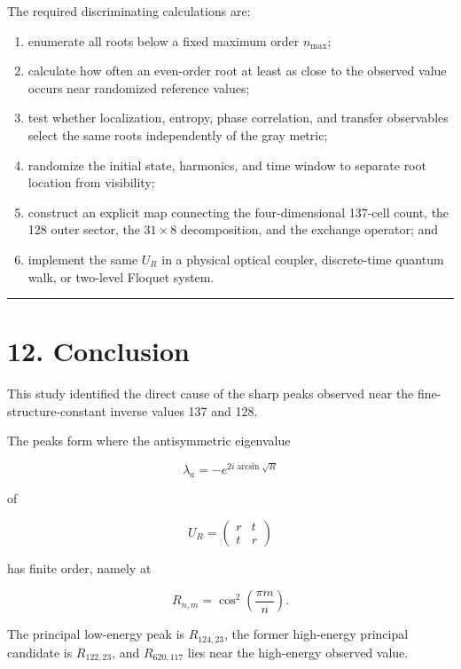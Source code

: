 \documentclass[
  10pt,
  a4paper,
]{article}
\providecommand{\tightlist}{%
  \setlength{\itemsep}{0pt}\setlength{\parskip}{0pt}}
\begin{document}
The required discriminating calculations are:

\begin{enumerate}
\def\labelenumi{\arabic{enumi}.}
\tightlist
\item
  enumerate all roots below a fixed maximum order \(n_{\max}\);
\item
  calculate how often an even-order root at least as close to the
  observed value occurs near randomized reference values;
\item
  test whether localization, entropy, phase correlation, and transfer
  observables select the same roots independently of the gray metric;
\item
  randomize the initial state, harmonics, and time window to separate
  root location from visibility;
\item
  construct an explicit map connecting the four-dimensional 137-cell
  count, the 128 outer sector, the \(31\times8\) decomposition, and the
  exchange operator; and
\item
  implement the same \(U_R\) in a physical optical coupler,
  discrete-time quantum walk, or two-level Floquet system.
\end{enumerate}

\begin{center}\rule{0.5\linewidth}{0.5pt}\end{center}

\section{12. Conclusion}\label{conclusion}

This study identified the direct cause of the sharp peaks observed near
the fine-structure-constant inverse values 137 and 128.

The peaks form where the antisymmetric eigenvalue

\[
\lambda_a=-e^{2i\arcsin\sqrt R}
\]

of

\[
U_R=
\begin{pmatrix}
r&t\\t&r
\end{pmatrix}
\]

has finite order, namely at

\[
R_{n,m}
=\cos^2\left(\frac{\pi m}{n}\right).
\]

The principal low-energy peak is \(R_{124,23}\), the former high-energy
principal candidate is \(R_{122,23}\), and \(R_{620,117}\) lies near the
high-energy observed value.
\end{document}
